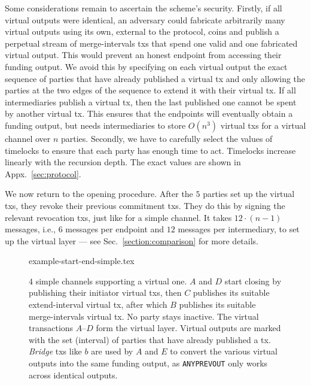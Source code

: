   Some considerations remain to ascertain the scheme's security.
  Firstly, if all virtual outputs
  were identical, an adversary could fabricate arbitrarily many virtual outputs using
  its own, external to the protocol, coins and publish a perpetual stream of
  merge-intervals txs that spend one valid and one fabricated virtual output.
  This would prevent an honest endpoint from accessing their funding output.
  We avoid this by
  specifying on each virtual output the exact sequence of parties that have
  already published a virtual tx and only allowing the parties at the two edges
  of the sequence
  to extend it with their virtual tx. If all intermediaries publish a virtual
  tx, then the last published one cannot be spent by
  another virtual
  tx. This ensures that the endpoints will eventually obtain a funding
  output, but needs intermediaries to store
  $O(n^3)$ virtual txs for a virtual channel over $n$ parties. Secondly,
  we have to carefully select the values of timelocks to ensure that
  each party has enough time to act. Timelocks increase linearly
  with the recursion depth. The exact values are shown in
  Appx.~\ref{sec:protocol}.

  We now return to the opening procedure. After the $5$ parties set up the virtual txs, they revoke their previous
  commitment
  txs. They do this by signing the relevant revocation txs, just like
  for a simple channel. It takes $12 \cdot (n-1)$ messages, i.e., $6$ messages
  per endpoint and $12$ messages per intermediary, to set up the virtual layer
  --- see Sec.~\ref{section:comparison} for more details.

  \addtolength{\intextsep}{-15pt}
  \begin{figure*}
    \centering
    {example-start-end-simple.tex}
    \caption{$4$ simple channels supporting a virtual one. $A$ and $D$ start
    closing by publishing their initiator virtual txs, then $C$ publishes its
    suitable extend-interval virtual tx, after which $B$ publishes its suitable
    merge-intervals virtual tx. No party stays inactive. The virtual
    transactions $A$--$D$ form the virtual layer. Virtual outputs are marked
    with the set (interval) of parties that have already published a tx.
    \emph{Bridge} txs like $b$ are used by $A$ and $E$ to convert the various
    virtual outputs into the same funding output, as \texttt{ANYPREVOUT} only
    works across identical outputs.}
    \label{figure:example-start-end-simple}
  \end{figure*}
  \addtolength{\intextsep}{15pt}

